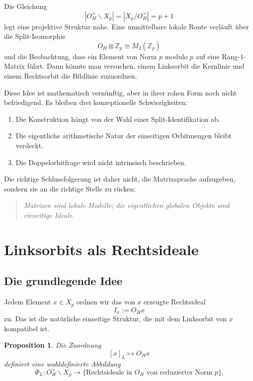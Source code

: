 \documentclass[12pt,a4paper]{article}
\newtheorem{proposition}[satz]{Proposition}
\theoremstyle{definition}
\newcommand{\OH}{O_H}
\newcommand{\Z}{\mathbb{Z}}
\begin{document}
	Die Gleichung
	\[
	|\OH^\times\backslash X_p|=|X_p/\OH^\times|=p+1
	\]
	legt eine projektive Struktur nahe. Eine unmittelbare lokale Route verläuft über die Split-Isomorphie
	\[
	\OH\otimes \Z_p \cong M_2(\Z_p)
	\]
	und die Beobachtung, dass ein Element von Norm \(p\) modulo \(p\) auf eine Rang-\(1\)-Matrix führt. Dann könnte man versuchen, einem Linksorbit die Kernlinie und einem Rechtsorbit die Bildlinie zuzuordnen.
	
	Diese Idee ist mathematisch vernünftig, aber in ihrer rohen Form noch nicht befriedigend. Es bleiben drei konzeptionelle Schwierigkeiten:
	
	\begin{enumerate}[label=(\arabic*)]
		\item Die Konstruktion hängt von der Wahl einer Split-Identifikation ab.
		\item Die eigentliche arithmetische Natur der einseitigen Orbitmengen bleibt verdeckt.
		\item Die Doppelorbitfrage wird nicht intrinsisch beschrieben.
	\end{enumerate}
	
	Die richtige Schlussfolgerung ist daher nicht, die Matrixsprache aufzugeben, sondern sie an die richtige Stelle zu rücken:
	\begin{quote}
		\emph{Matrizen sind lokale Modelle; die eigentlichen globalen Objekte sind einseitige Ideale.}
	\end{quote}
	
	\section{Linksorbits als Rechtsideale}
	
	\subsection{Die grundlegende Idee}
	
	Jedem Element \(x\in X_p\) ordnen wir das von \(x\) erzeugte Rechtsideal
	\[
	I_x:=\OH x
	\]
	zu. Das ist die natürliche einseitige Struktur, die mit dem Linksorbit von \(x\) kompatibel ist.
	
	\begin{proposition}
		Die Zuordnung
		\[
		[x]_L \longmapsto \OH x
		\]
		definiert eine wohldefinierte Abbildung
		\[
		\Phi_L:\OH^\times\backslash X_p \longrightarrow
		\{\text{Rechtsideale in }\OH\text{ von reduzierter Norm }p\}.
		\]
	\end{proposition}
	
\end{document}
